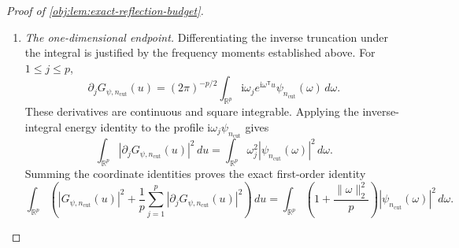 \documentclass[11pt]{article}
\begin{document}
\begin{proof}[Proof of \cref{obj:lem:exact-reflection-budget}]
\begin{enumerate}
To identify their limit explicitly, let \(\mathcal F_{\mathrm{cyc},p}\) denote the unitary \(L^2\) extension of
\[
(\mathcal F_{\mathrm{cyc},p}\psi)(\eta)
=
\int_{\mathbb R^p}\psi(\omega)
e^{-2\pi\mathrm i\eta^{\mathsf T}\omega}\,d\omega,
\qquad \psi\in L^1\cap L^2,\quad \eta\in\mathbb R^p,
\]
and define, as an \(L^2\) class,
\[
(\mathcal I_p\psi)(u)
=
(2\pi)^{-p/2}
(\mathcal F_{\mathrm{cyc},p}\psi)\!\left(-\frac{u}{2\pi}\right).
\]
The squared prefactor \((2\pi)^{-p}\) cancels the dilation Jacobian \((2\pi)^p\). Thus
\[
\|\mathcal I_p\psi\|_2^2=\|\psi\|_2^2,
\qquad
\|\mathcal I_p\psi-\mathcal I_p\chi\|_2^2=\|\psi-\chi\|_2^2,
\qquad \psi,\chi\in L^2(\mathbb R^p;\mathbb C).
\]
The defining integral identifies
\(G_{\psi,n_{\mathrm{cut}}}=\mathcal I_p\psi_{n_{\mathrm{cut}}}\) almost everywhere, whence
\[
\|G_{\psi,n_{\mathrm{cut}}}-\mathcal I_p\psi\|_2^2
=
\|\psi_{n_{\mathrm{cut}}}-\psi\|_2^2
\longrightarrow0.
\]

For an admissible extension \(G\in L^1\cap L^2\), its original spatial class is recovered by this construction. Fubini, applied to the integrable product of the truncated profile and an \(L^1\cap L^2\) test function \(\varphi\), gives
\[
\int_{\mathbb R^p}\overline{\varphi(u)}
G_{\psi,n_{\mathrm{cut}}}(u)\,du
=
\int_{\mathbb R^p}
\overline{(\mathcal F_p\varphi)(\omega)}
\psi_{n_{\mathrm{cut}}}(\omega)\,d\omega.
\]
Taking \(\psi=\mathcal F_pG\) and \(\varphi=G\), and expanding the squared distance using this pairing and the two Plancherel identities, yields
\[
\|G-G_{\mathcal F_pG,n_{\mathrm{cut}}}\|_2^2
=
\|\mathcal F_pG-(\mathcal F_pG)_{n_{\mathrm{cut}}}\|_2^2
\longrightarrow0.
\]
Uniqueness of the \(L^2\) limit therefore gives
\[
\mathcal I_p(\mathcal F_pG)=G
\quad\text{almost everywhere}.
\]

\item \textit{The one-dimensional endpoint.}
Differentiating the inverse truncation under the integral is justified by the frequency moments established above. For \(1\leq j\leq p\),
\[
\partial_jG_{\psi,n_{\mathrm{cut}}}(u)
=
(2\pi)^{-p/2}
\int_{\mathbb R^p}
\mathrm i\omega_j e^{\mathrm i\omega^{\mathsf T}u}
\psi_{n_{\mathrm{cut}}}(\omega)\,d\omega.
\]
These derivatives are continuous and square integrable. Applying the inverse-integral energy identity to the profile
\(\mathrm i\omega_j\psi_{n_{\mathrm{cut}}}\) gives
\[
\int_{\mathbb R^p}
|\partial_jG_{\psi,n_{\mathrm{cut}}}(u)|^2\,du
=
\int_{\mathbb R^p}
\omega_j^2|\psi_{n_{\mathrm{cut}}}(\omega)|^2\,d\omega.
\]
Summing the coordinate identities proves the exact first-order identity
\[
\int_{\mathbb R^p}
\left(
|G_{\psi,n_{\mathrm{cut}}}(u)|^2+
\frac1p\sum_{j=1}^p
|\partial_jG_{\psi,n_{\mathrm{cut}}}(u)|^2
\right)\,du
=
\int_{\mathbb R^p}
\left(1+\frac{\|\omega\|_2^2}{p}\right)
|\psi_{n_{\mathrm{cut}}}(\omega)|^2\,d\omega.
\]


\end{enumerate}
\end{proof}
\end{document}
